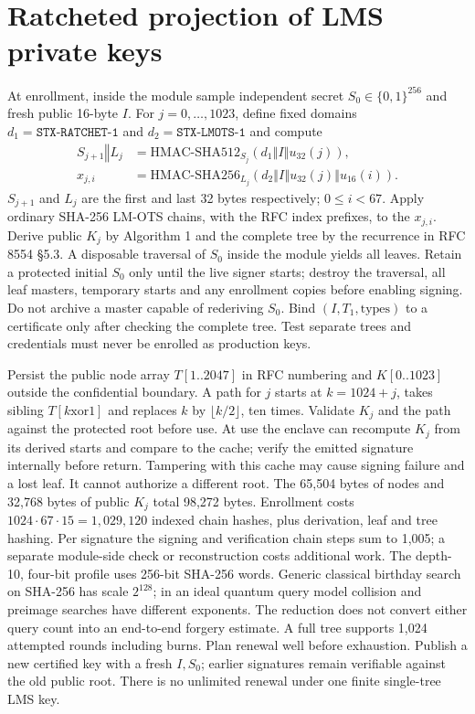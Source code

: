\documentclass[10pt,twocolumn,letterpaper]{article}
\newcommand{\cat}{\mathbin\Vert}
\begin{document}
\section{Ratcheted projection of LMS private keys}
At enrollment, inside the module sample independent secret $S_0\in\{0,1\}^{256}$ and fresh public 16-byte $I$. For $j=0,\ldots,1023$, define fixed domains $d_1=\texttt{STX-RATCHET-1}$ and $d_2=\texttt{STX-LMOTS-1}$ and compute
\begin{align*}
 S_{j+1}\cat L_j
    &=\mathrm{HMAC\text{-}SHA512}_{S_j}(d_1\cat I\cat u_{32}(j)),\\
 x_{j,i}&=\mathrm{HMAC\text{-}SHA256}_{L_j}
        (d_2\cat I\cat u_{32}(j)\cat u_{16}(i)).
\end{align*}
$S_{j+1}$ and $L_j$ are the first and last 32 bytes respectively; $0\le i<67$. Apply ordinary SHA-256 LM-OTS chains, with the RFC index prefixes, to the $x_{j,i}$. Derive public $K_j$ by Algorithm 1 and the complete tree by the recurrence in RFC 8554 \S5.3. A disposable traversal of $S_0$ inside the module yields all leaves. Retain a protected initial $S_0$ only until the live signer starts; destroy the traversal, all leaf masters, temporary starts and any enrollment copies before enabling signing. Do not archive a master capable of rederiving $S_0$. Bind $(I,T_1,\text{types})$ to a certificate only after checking the complete tree. Test separate trees and credentials must never be enrolled as production keys.

Persist the public node array $T[1..2047]$ in RFC numbering and $K[0..1023]$ outside the confidential boundary. A path for $j$ starts at $k=1024+j$, takes sibling $T[k\mathbin{\mathrm{xor}}1]$ and replaces $k$ by $\lfloor k/2\rfloor$, ten times. Validate $K_j$ and the path against the protected root before use. At use the enclave can recompute $K_j$ from its derived starts and compare to the cache; verify the emitted signature internally before return. Tampering with this cache may cause signing failure and a lost leaf. It cannot authorize a different root. The 65,504 bytes of nodes and 32,768 bytes of public $K_j$ total 98,272 bytes. Enrollment costs $1024\cdot67\cdot15=1,029,120$ indexed chain hashes, plus derivation, leaf and tree hashing. Per signature the signing and verification chain steps sum to 1,005; a separate module-side check or reconstruction costs additional work. The depth-10, four-bit profile uses 256-bit SHA-256 words. Generic classical birthday search on SHA-256 has scale $2^{128}$; in an ideal quantum query model collision and preimage searches have different exponents. The reduction does not convert either query count into an end-to-end forgery estimate. A full tree supports 1,024 attempted rounds including burns. Plan renewal well before exhaustion. Publish a new certified key with a fresh $I,S_0$; earlier signatures remain verifiable against the old public root. There is no unlimited renewal under one finite single-tree LMS key.
\end{document}
